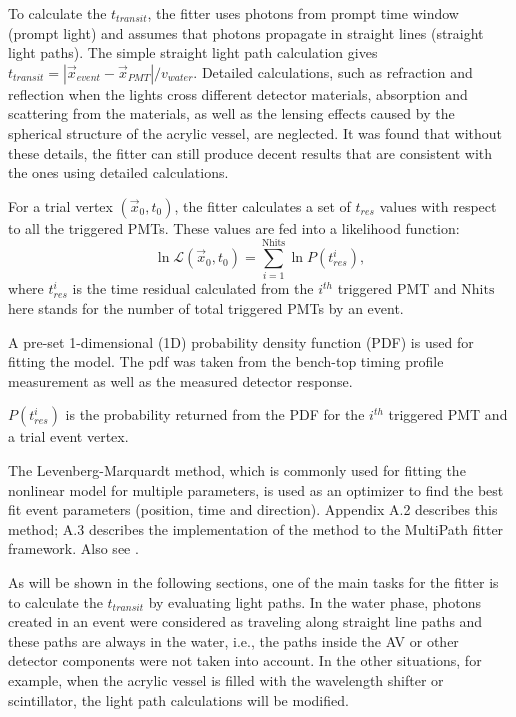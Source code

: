 To calculate the $t_{transit}$, the fitter uses photons from prompt time window (prompt light) and assumes that photons propagate in straight lines (straight light paths). The simple straight light path calculation gives $t_{transit}=|\vec{x}_{event}-\vec{x}_{PMT}|/v_{water}$. Detailed calculations, such as refraction and reflection when the lights cross different detector materials, absorption and scattering from the materials, as well as the lensing effects caused by the spherical structure of the acrylic vessel, are neglected. It was found that without these details, the fitter can still produce decent results that are consistent with the ones using detailed calculations. 

For a trial vertex $(\vec{x}_0,t_0)$, the fitter calculates a set of $t_{res}$ values with respect to all the triggered PMTs. These values are fed into a likelihood function: 
\begin{equation}
\ln\mathcal{L}(\vec{x}_0,t_0)=\sum_{i=1}^{{\mathrm{Nhits}}}\ln P(t^i_{res}),
\end{equation}
where $t^i_{res}$ is the time residual calculated from the $i^{th}$ triggered PMT and $\mathrm{Nhits}$ here stands for the number of total triggered PMTs by an event.

A pre-set 1-dimensional (1D) probability density function (PDF) is used for fitting the model. The pdf was taken from the bench-top timing profile measurement as well as the measured detector response.

$P(t^i_{res})$ is the probability returned from the PDF for the $i^{th}$ triggered PMT and a trial event vertex.

The Levenberg-Marquardt method, which is commonly used for fitting the nonlinear model for multiple parameters, is used as an optimizer to find the best fit event parameters (position, time and direction). Appendix A.2 describes this method; A.3 describes the implementation of the method to the MultiPath fitter framework. Also see \cite{gregory2005bayesian, press2007numerical}.

As will be shown in the following sections, one of the main tasks for the fitter is to calculate the $t_{transit}$ by evaluating light paths. In the water phase, photons created in an event were considered as traveling along straight line paths and these paths are always in the water, i.e., the paths inside the AV or other detector components were not taken into account. In the other situations, for example, when the acrylic vessel is filled with the wavelength shifter or scintillator, the light path calculations will be modified.   

